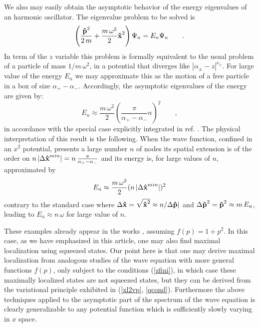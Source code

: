 \documentclass[a4paper,10pt]{article}
\newcommand{\x}{\mbox{\rm{\bf \^ x}}}
\newcommand{\p}{\mbox{\rm{\bf \^ p}}}
\begin{document}
We also may easily obtain the asymptotic behavior of the energy
eigenvalues of an harmonic oscillator. The eigenvalue problem to
be solved is
\begin{equation}
\left(\frac{\p^2}{2\,m}+\frac{m\,\omega^2}2\x^2\right)\Psi_n
=E_n\Psi_n\qquad .
\end{equation}
In term of the $z$ variable this problem is formally equivalent to
the usual problem of a particle of mass $1/m\,\omega^2$, in a
potential that diverges like $|\alpha_\pm-z|^{\nu_\pm}$. For large
value of the energy $E_n$ we may approximate this as the motion of
a free particle in a box of size $\alpha_+-\alpha_-$. Accordingly,
the asymptotic eigenvalues of the energy are given by:
\begin{equation}
E_n\approx\frac{m\,\omega^2}2(\frac
\pi{\alpha_+-\alpha_-}n)^2\qquad,
\end{equation}
in accordance with the special case explicitly integrated in ref.
\cite{K2}. The physical interpretation of this result \cite{RB} is
the following. When the wave function, confined in an $x^2$
potential, presents a large number $n$ of nodes its spatial
extension is of the order on $n\, |\Delta \x^{min}|=n\, \frac
\pi{\alpha_+-\alpha_-}$ and its energy is, for large values of
$n$, approximated by
\begin{equation}
E_n\approx\frac{m\,\omega^2}2(n\, |\Delta \x^{min}|)^2
\end{equation}
contrary to the standard case where $\Delta \x =\sqrt{\x^2}\approx
n/\Delta\p|$ and $\Delta\p^2=\p^2\approx m\,E_n$, leading to
$E_n\approx n\,\omega$ for large value of $n$.

These examples already appear in the works \cite{BGLS, K2},
assuming $f(p)=1+p^2$. In this case, as we have emphasized in this
article, one may also find maximal localization using squeezed
states. Our point here is that one may derive maximal localization
from analogous studies of the wave equation with more general
functions $f(p)$, only subject to the conditions (\ref{zfini}), in
which case these maximally localized states are not squeezed
states, but they can be derived from the variational principle
exhibited in (\ref{xl2vp}, \ref{qcond}). Furthermore the above
techniques applied to the asymptotic part of the spectrum of the
wave equation is clearly generalizable to any potential function
which is sufficiently slowly varying in $x$ space.
\end{document}
